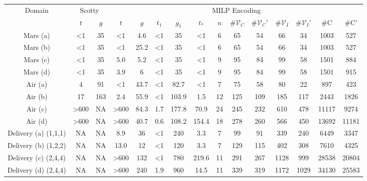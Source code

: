 \documentclass[sigconf]{acmart}
\begin{document}
\begin{table}[t]
\label{tab:results}
\begin{tabular}{|c||c|c||c|c|c|c|c||c|c|c|c|c|c|c|}
\hline
\multirow{2}{*}{Domain} & \multicolumn{2}{c|}{Scotty} & \multicolumn{12}{c|}{MILP Encoding} \\ \cline{2-15} 
 & $t$ & $g$ & $t$ & $g$ & $t_1$ & $g_1$ & $t_*$ & $n$ & $\# \mathcal{V}_C$ & $\# \mathcal{V}_C'$ & $\# \mathcal{V}_I$ & $\# \mathcal{V}_I'$ & \#C & \#C' \\ \hline
Mars (a) & \textless{1} & 35 & \textless{1} & 4.6 & \textless{1} & 35 & \textless{1} & 6 & 65 & 54 & 66 & 34 & 1003 & 527 \\ \hline
Mars (b) & \textless{1} & 35 & \textless{1} & 25.2 & \textless{1} & 35 & \textless{1} & 6 & 65 & 54 & 66 & 34 & 1003 & 527 \\ \hline
Mars (c) & \textless{1} & 35 & 5.0 & 5.2 & \textless{1} & 35 & \textless{1} & 9 & 95 & 84 & 99 & 58 & 1501 & 884 \\ \hline
Mars (d) & \textless{1} & 35 & 3.9 & 6 & \textless{1} & 35 & \textless{1} & 9 & 95 & 84 & 99 & 58 & 1501 & 915  \\ \hline
Air (a) & 4 & 91 & \textless{1} & 43.7 & \textless{1} & 82.7 & \textless{1} & 7 & 75 & 58 & 80 & 22 & 897 & 423 \\ \hline
Air (b) & 17 & 163 & 2.4 & 55.9 & \textless{1} & 103.9 & 1.5 & 12 & 125 & 109 & 185 & 117 & 2443 & 1826 \\ \hline
Air (c) & \textgreater{600} & NA & \textgreater{600} & 84.3 & 1.7 & 177.8 & 70.9 & 24 & 245 & 232 & 610 & 478 & 11117 & 9274 \\ \hline
Air (d) & \textgreater{600} & NA & \textgreater{600} & 40.7 & 0.6 & 108.2 & 154.4 & 18 & 278 & 260 & 566 & 450 & 13692 & 11181 \\ \hline
Delivery (a) (1,1,1) & NA & NA & 8.9 & 36 & \textless{1} & 240 & 3.3 & 7 & 99 & 91 & 339 & 240 & 6449 & 3347 \\ \hline
Delivery (b) (1,2,2) & NA & NA & 13.0 & 12 & \textless{1} & 120 & 3.3 & 7 & 129 & 115 & 402 & 308 & 7610 & 4325 \\ \hline
Delivery (c) (2,4,4) & NA & NA & \textgreater{600} & 132 & \textless{1} & 780 & 219.6 & 11 & 291 & 267 & 1128 & 999 & 28538 & 20804 \\ \hline
Delivery (d) (2,4,4) & NA & NA & \textgreater{600} & 240 & 1.9 & 960 & 14.5 & 11 & 339 & 319 & 1172 & 1029 & 34130 & 25583 \\ \hline
\end{tabular}

\end{table}
\end{document}
